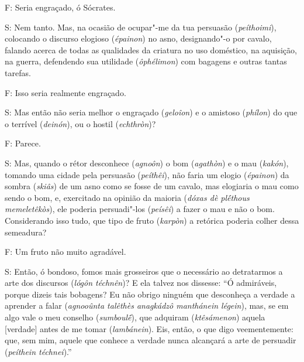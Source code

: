 F: Seria engraçado, ó Sócrates.

S: Nem tanto. Mas, na ocasião de ocupar"-me da tua persuasão
(\emph{peíthoimi}), colocando o discurso elogioso (\emph{épainon}) no
asno, designando"-o por cavalo, falando acerca de todas as qualidades da
criatura no uso doméstico, na aquisição, na guerra, defendendo sua
utilidade (\emph{ôphélimon}) com bagagens e outras tantas tarefas.

\bekker{[260c]} F: Isso seria realmente engraçado.

S: Mas então não seria melhor o engraçado (\emph{geloîon}) e o amistoso
(\emph{phílon}) do que o terrível (\emph{deinón}), ou o hostil
(\emph{echthròn})?

F: Parece.

S: Mas, quando o rétor desconhece (\emph{agnoôn}) o bom (\emph{agathòn})
e o mau (\emph{kakón}), tomando uma cidade pela persuasão
(\emph{peíthêi}), não faria um elogio (\emph{épainon}) da sombra
(\emph{skiâs}) de um asno como se fosse de um cavalo, mas elogiaria o
mau como sendo o bom, e, exercitado na opinião da maioria (\emph{dóxas
dè plḗthous memeletêkòs}), ele poderia persuadi"-los (\emph{peísêi}) a
fazer o mau e não o bom. Considerando isso tudo, que tipo de fruto
(\emph{karpòn}) a retórica poderia colher dessa semeadura?

F: Um fruto não muito agradável.

S: Então, ó bondoso, fomos mais grosseiros que o necessário ao
detratarmos a arte dos discursos (\emph{lógôn téchnên})? E ela talvez
nos dissesse: ``Ó admiráveis, porque dizeis tais bobagens? Eu não obrigo
ninguém que desconheça a verdade a aprender a falar (\emph{agnooûnta
talêthès anagkádzô manthánein légein}), mas, se em algo vale o meu
conselho (\emph{sumboulḗ}), que adquiram (\emph{ktêsámenon}) aquela
[verdade] antes de me tomar (\emph{lambánein}). Eis, então, o que digo
veementemente: que, sem mim, aquele que conhece a verdade nunca
alcançará a arte de persuadir (\emph{peíthein téchnei}).''

